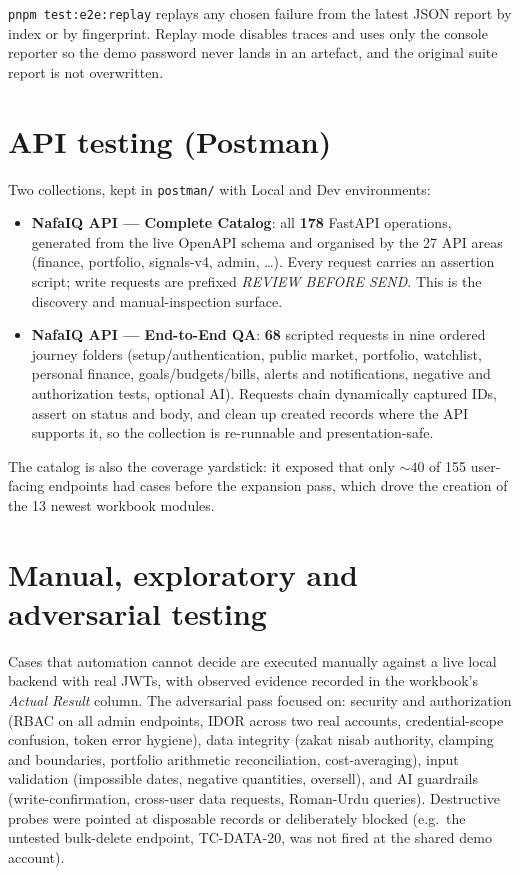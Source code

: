 \documentclass[11pt,a4paper]{article}
\begin{document}
\texttt{pnpm test:e2e:replay} replays any chosen failure from the latest JSON
report by index or by fingerprint. Replay mode disables traces and uses only
the console reporter so the demo password never lands in an artefact, and the
original suite report is not overwritten.

\section{API testing (Postman)}\label{sec:api}

Two collections, kept in \texttt{postman/} with Local and Dev environments:

\begin{itemize}
  \item \textbf{NafaIQ API --- Complete Catalog}: all \textbf{178} FastAPI operations,
        generated from the live OpenAPI schema and organised by the 27 API
        areas (finance, portfolio, signals-v4, admin, \ldots). Every request
        carries an assertion script; write requests are prefixed
        \emph{REVIEW BEFORE SEND}. This is the discovery and manual-inspection
        surface.
  \item \textbf{NafaIQ API --- End-to-End QA}: \textbf{68} scripted requests in nine
        ordered journey folders (setup/authentication, public market, portfolio,
        watchlist, personal finance, goals/budgets/bills, alerts and
        notifications, negative and authorization tests, optional AI).
        Requests chain dynamically captured IDs, assert on status and body, and
        clean up created records where the API supports it, so the collection
        is re-runnable and presentation-safe.
\end{itemize}

The catalog is also the coverage yardstick: it exposed that only ${\sim}40$ of 155
user-facing endpoints had cases before the expansion pass, which drove the
creation of the 13 newest workbook modules.

\section{Manual, exploratory and adversarial testing}\label{sec:manual}

Cases that automation cannot decide are executed manually against a live local
backend with real JWTs, with observed evidence recorded in the workbook's
\emph{Actual Result} column. The adversarial pass focused on:
security and authorization (RBAC on all admin endpoints, IDOR across two real
accounts, credential-scope confusion, token error hygiene), data integrity
(zakat nisab authority, clamping and boundaries, portfolio arithmetic
reconciliation, cost-averaging), input validation (impossible dates, negative
quantities, oversell), and AI guardrails (write-confirmation, cross-user data
requests, Roman-Urdu queries). Destructive probes were pointed at disposable
records or deliberately blocked (e.g.\ the untested bulk-delete endpoint,
TC-DATA-20, was not fired at the shared demo account).
\end{document}
